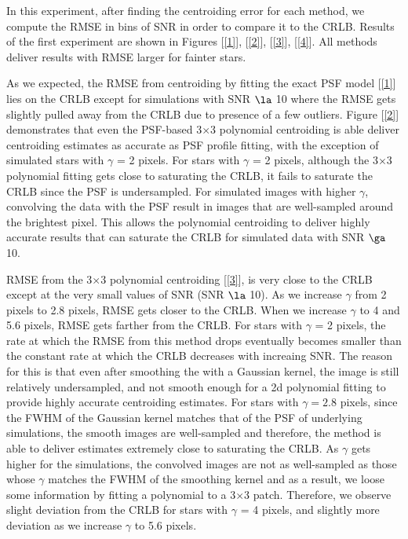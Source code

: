 \documentclass[12pt, preprint]{aastex}
\begin{document}
In this experiment, after finding the centroiding error for each method,
we compute the RMSE in bins of SNR in order to compare it to the CRLB. 
Results of the first experiment are shown in Figures [\ref{1}], [\ref{2}],
[\ref{3}], [\ref{4}]. All methods deliver results with RMSE larger 
for fainter stars.

As we expected, the RMSE from centroiding by fitting the exact PSF model [\ref{1}]
lies on the CRLB except for simulations with SNR $\la$ 10 where the RMSE gets slightly pulled away
from the CRLB due to presence of a few outliers. Figure [\ref{2}] demonstrates that even the PSF-based 3$\times$3 polynomial 
centroiding is able deliver centroiding estimates as accurate as PSF profile fitting, with the exception
of simulated stars with $\gamma$ = 2 pixels. For stars with $\gamma$ = 2 pixels, although the 3$\times$3 polynomial
fitting gets close to saturating the CRLB, it fails to saturate the CRLB since the PSF is undersampled. For simulated images with higher $\gamma$, convolving the
data with the PSF result in images that are well-sampled around the brightest pixel. This allows the 
polynomial centroiding to deliver highly accurate results that can saturate the CRLB for simulated
data with SNR $\ga$ 10.

RMSE from the 3$\times$3 polynomial centroiding [\ref{3}],
is very close to the CRLB except at the very small values of SNR (SNR $\la$ 10).
As we increase $\gamma$ from 2 pixels to 2.8 pixels, RMSE gets closer
to the CRLB. When we increase $\gamma$ to
4 and 5.6 pixels, RMSE gets farther from the CRLB. For stars with $\gamma$ = 2 pixels, 
the rate at which the RMSE from this method drops
eventually becomes smaller than the constant rate at which the CRLB
decreases with increaing SNR. The reason for this is that even after smoothing
the with a Gaussian kernel, the image is still relatively undersampled, and not smooth enough
for a 2d polynomial fitting to provide highly accurate centroiding estimates.
For stars with $\gamma=2.8$ pixels, since the FWHM of the Gaussian kernel matches that 
of the PSF of underlying simulations, the smooth images are well-sampled and therefore, 
the method is able to deliver estimates extremely close to saturating the CRLB. As $\gamma$
gets higher for the simulations, the convolved images are not as well-sampled as those 
whose $\gamma$ matches the FWHM of the smoothing kernel and as a result, we loose
some information by fitting a polynomial to a 3$\times$3 patch. Therefore,
 we observe slight deviation from the CRLB for stars with $\gamma$ = 4 pixels, and 
slightly more deviation as we increase $\gamma$ to 5.6 pixels.
\end{document}
